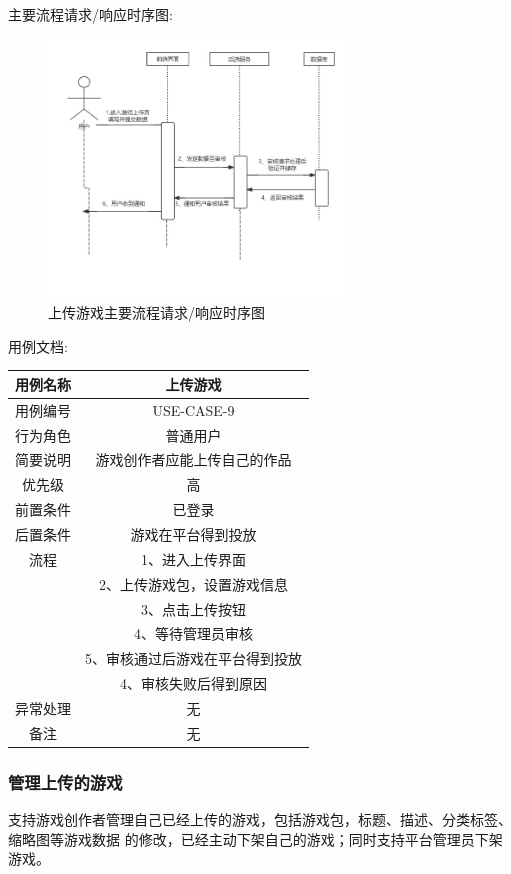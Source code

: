 \documentclass[12pt]{ctexart} %
\begin{document}
主要流程请求/响应时序图:
\begin{figure}[ht]
  \centering
  \includegraphics[width=0.7\textwidth]{yongli9.jpg}
  \caption{上传游戏主要流程请求/响应时序图}
\end{figure}
用例文档:

\begin{tabular}{|c|c|}
  \hline
  用例名称& 上传游戏\\
  \hline
  用例编号 & USE-CASE-9\\
  \hline
  行为角色 & 普通用户\\
  \hline
  简要说明 & 游戏创作者应能上传自己的作品\\
  \hline
  优先级 & 高\\
  \hline
  前置条件 & 已登录\\
  \hline
  后置条件 & 游戏在平台得到投放\\
  \hline
  流程 & 1、进入上传界面\\
      &  2、上传游戏包，设置游戏信息\\
      &  3、点击上传按钮\\
      &  4、等待管理员审核\\
      &  5、审核通过后游戏在平台得到投放\\
      &  4、审核失败后得到原因\\
  \hline
  异常处理 & 无\\
  \hline
  备注 & 无\\
  \hline
\end{tabular}

\subsubsection{管理上传的游戏}
支持游戏创作者管理自己已经上传的游戏，包括游戏包，标题、描述、分类标签、缩略图等游戏数据
的修改，已经主动下架自己的游戏；同时支持平台管理员下架游戏。
\end{document}
